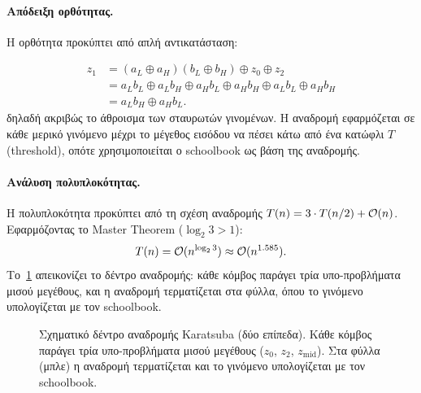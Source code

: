 {\paragraph{Απόδειξη ορθότητας.}
Η ορθότητα προκύπτει από απλή αντικατάσταση: 

\begin{align*}
  z_1 &= (a_L \oplus a_H)(b_L \oplus b_H) \oplus z_0 \oplus z_2 \\
      &= a_L b_L \oplus a_L b_H \oplus a_H b_L \oplus a_H b_H
         \oplus a_L b_L \oplus a_H b_H \\
      &= a_L b_H \oplus a_H b_L.
\end{align*}
δηλαδή ακριβώς το άθροισμα των σταυρωτών γινομένων.
Η αναδρομή εφαρμόζεται σε κάθε μερικό γινόμενο μέχρι το μέγεθος εισόδου να
πέσει κάτω από ένα κατώφλι $T$ (threshold), οπότε χρησιμοποιείται ο schoolbook ως βάση της αναδρομής.

\paragraph{Ανάλυση πολυπλοκότητας.}
Η πολυπλοκότητα προκύπτει από τη σχέση αναδρομής $T(n) = 3 \cdot T(n/2) + \mathcal{O}(n)$.
Εφαρμόζοντας το Master Theorem ($\log_2 3 > 1$):
\begin{equation}
  T(n) = \mathcal{O}(n^{\log_2 3}) \approx \mathcal{O}(n^{1.585}).
\end{equation}
Το~\cref{fig:karatsuba-tree-schematic} απεικονίζει το δέντρο αναδρομής: κάθε
κόμβος παράγει τρία υπο-προβλήματα μισού μεγέθους, και η αναδρομή τερματίζεται
στα φύλλα, όπου το γινόμενο υπολογίζεται με τον schoolbook.

\begin{figure}[htbp]
  \centering
  \resizebox{\linewidth}{!}{}
  \caption[Δέντρο αναδρομής Karatsuba]{Σχηματικό δέντρο αναδρομής Karatsuba (δύο επίπεδα). Κάθε κόμβος παράγει
  τρία υπο-προβλήματα μισού μεγέθους ($z_0$, $z_2$, $z_{\text{mid}}$). Στα φύλλα
  (μπλε) η αναδρομή τερματίζεται και το γινόμενο υπολογίζεται με τον schoolbook.}
  \label{fig:karatsuba-tree-schematic}
\end{figure}


}%

